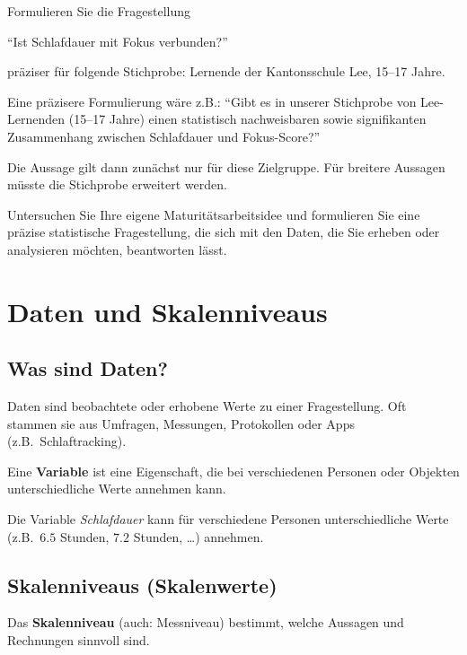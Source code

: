 \begin{myexercise}
	Formulieren Sie die Fragestellung
	\begin{center}
		``Ist Schlafdauer mit Fokus verbunden?''
	\end{center}
	präziser für folgende Stichprobe: Lernende der Kantonsschule Lee, 15--17 Jahre.

	\begin{myanswer}
		Eine präzisere Formulierung wäre z.B.: ``Gibt es in unserer Stichprobe von Lee-Lernenden (15--17 Jahre) einen statistisch nachweisbaren sowie signifikanten Zusammenhang zwischen Schlafdauer und Fokus-Score?''

		Die Aussage gilt dann zunächst nur für diese Zielgruppe. Für breitere Aussagen müsste die Stichprobe erweitert werden.
	\end{myanswer}
\end{myexercise}

\begin{myexercise}
	Untersuchen Sie Ihre eigene Maturitätsarbeitsidee und formulieren Sie eine präzise statistische Fragestellung, die sich mit den Daten, die Sie erheben oder analysieren möchten, beantworten lässt.
\end{myexercise}

\section{Daten und Skalenniveaus}

\subsection{Was sind Daten?}
Daten sind beobachtete oder erhobene Werte zu einer Fragestellung.
Oft stammen sie aus Umfragen, Messungen, Protokollen oder Apps (z.B.\ Schlaftracking).

\begin{mydefinition}\label{mydefinition:variable}
	Eine \textbf{Variable} ist eine Eigenschaft, die bei verschiedenen Personen oder Objekten unterschiedliche Werte annehmen kann.
\end{mydefinition}

\begin{myexample}
	Die Variable \textit{Schlafdauer} kann für verschiedene Personen unterschiedliche Werte (z.B.\ $6.5$ Stunden, $7.2$ Stunden, \dots) annehmen.
\end{myexample}

\subsection{Skalenniveaus (Skalenwerte)}
Das \textbf{Skalenniveau} (auch: Messniveau) bestimmt, welche Aussagen und Rechnungen sinnvoll sind.

